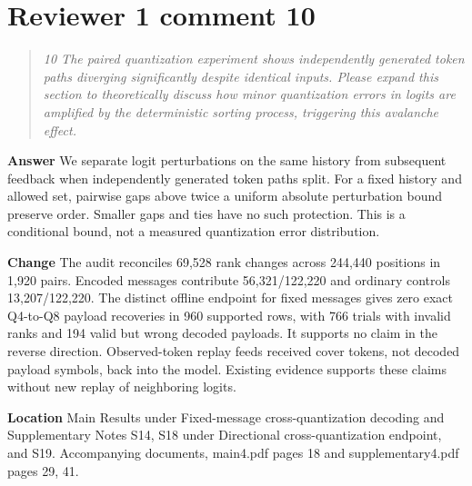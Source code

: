 \documentclass[11pt]{article}
\newenvironment{reviewcomment}{\begin{quote}\color{commentgray}\itshape}{\end{quote}}
\begin{document}

\section*{Reviewer 1 comment 10}\label{resp:R1-10}
\begin{reviewcomment}
10 The paired quantization experiment shows independently generated token paths diverging significantly despite identical inputs. Please expand this section to theoretically discuss how minor quantization errors in logits are amplified by the deterministic sorting process, triggering this avalanche effect.
\end{reviewcomment}

\textbf{Answer} We separate logit perturbations on the same history from subsequent feedback when independently generated token paths split. For a fixed history and allowed set, pairwise gaps above twice a uniform absolute perturbation bound preserve order. Smaller gaps and ties have no such protection. This is a conditional bound, not a measured quantization error distribution.

\textbf{Change} The audit reconciles 69,528 rank changes across 244,440 positions in 1,920 pairs. Encoded messages contribute 56,321/122,220 and ordinary controls 13,207/122,220. The distinct offline endpoint for fixed messages gives zero exact Q4-to-Q8 payload recoveries in 960 supported rows, with 766 trials with invalid ranks and 194 valid but wrong decoded payloads. It supports no claim in the reverse direction. Observed-token replay feeds received cover tokens, not decoded payload symbols, back into the model. Existing evidence supports these claims without new replay of neighboring logits.

\textbf{Location} Main Results under Fixed-message cross-quantization decoding and Supplementary Notes S14, S18 under Directional cross-quantization endpoint, and S19. Accompanying documents, main4.pdf pages 18 and supplementary4.pdf pages 29, 41.

\end{document}

